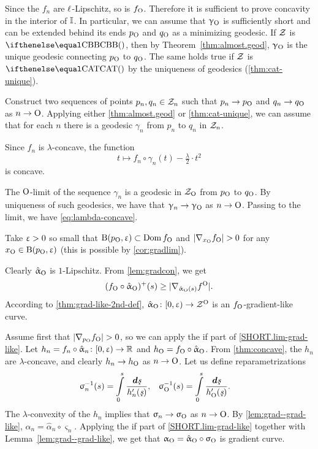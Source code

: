 Since the $f_n$ are ${\ell}$-Lipschitz, so is $f_{\mathrm{O}}$.
Therefore it is sufficient to prove concavity in the interior of $\mathbb{I}$.
In particular, we can assume that $\upgamma_{\mathrm{O}}$ is sufficiently short and can be extended behind its ends $p_{\mathrm{O}}$ and $q_{\mathrm{O}}$ as a minimizing geodesic.
If $\mathcal{Z}$ is $\Alex{}$, then by Theorem~\ref{thm:almost.geod}, $\upgamma_{\mathrm{O}}$ is the unique geodesic connecting $p_{\mathrm{O}}$ to $q_{\mathrm{O}}$.
The same holds true if $\mathcal{Z}$ is $\CAT{}$ by the uniqueness of geodesics (\ref{thm:cat-unique}).

Construct two sequences of points $p_n,q_n\in\spc{Z}_n$ such that $p_n\to p_\o$ and $q_n\to q_\o$ as $n\to \o$.
Applying either \ref{thm:almost.geod} or \ref{thm:cat-unique},
we can assume that for each $n$ there is a geodesic $\gamma_n$ from $p_n$ to $q_n$ in $\mathcal{Z}_n$.

Since $f_n$ is $\lambda$-concave, the function 
\[t\mapsto f_n\circ\gamma_n(t)-\tfrac\lambda 2\cdot t^2\]
is concave.

The $\mathrm{O}$-limit of the sequence $\gamma_n$ is a geodesic in $\mathcal{Z}_{\mathrm{O}}$ from $p_{\mathrm{O}}$ to $q_{\mathrm{O}}$.
By uniqueness of such geodesics, we have that $\gamma_n\to \gamma_\o$ as $n\to \o$.
Passing to the limit, we have \ref{eq:lambda-concave}.

Take $\upvarepsilon>0$ so small that $\oBall(p_\o,\eps)\subset\Dom f_\o$ and $|\nabla_{x_\o}f_\o|\z>0$ for any $x_\o\in\oBall(p_\o,\eps)$ (this is possible by \ref{cor:gradlim}).

Clearly $\hat{\upalpha}_{\mathrm{O}}$ is $1$-Lipschitz.
From \ref{lem:gradcon}, we get 
\[(f_\o\circ\hat\alpha_\o)^+(s)
\ge
|\nabla_{\hat\alpha_\o(s)}f^\o|.\]
According to \ref{thm:grad-like-2nd-def}, $\hat\alpha_\o\:[0,\eps)\to \spc{Z}^\o$  is an $f_{\mathrm{O}}$-gradient-like curve.

Assume first that $|\nabla_{p_\o}f_\o|>0$, 
so we can apply the if part of \ref{SHORT.lim-grad-like}.
Let $h_n=f_n\circ\hat\alpha_n\:[0,\eps)\to \RR$ 
and $h_\o=f_\o\circ\hat\alpha_\o$.
From \ref{thm:concave}, the $h_n$ are $\lambda$-concave, and clearly $h_n\to h_\o$ as $n\to\o$.
Let us define reparametrizations
\begin{align*}
{\varsigma_n^{-1}(s)}
&=
\int\limits_0^{s}\frac{\dd\under s}{h_n'(\under s)},
&
{\varsigma_\o^{-1}(s)}
&=
\int\limits_0^{s}\frac{\dd\under s}{h_\o'(\under s)}.
\end{align*}
The $\lambda$-convexity of the $h_n$ implies that $\sigma_n\to\sigma_\o$ as $n\to\o$.
By \ref{lem:grad--grad-like}, 
$\alpha_n=\hat\alpha_n\circ\varsigma_n$.
Applying the if part of \ref{SHORT.lim-grad-like} together with Lemma~\ref{lem:grad--grad-like},
we get that $\alpha_\o=\hat\alpha_\o\circ\varsigma_\o$ is gradient curve.


